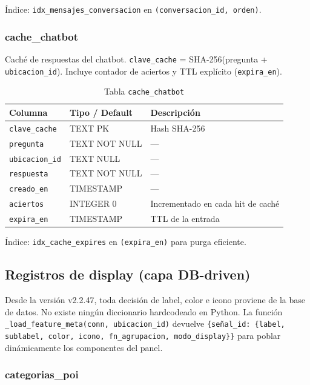 \documentclass[12pt, a4paper]{article}
\begin{document}
Índice: \texttt{idx\_mensajes\_conversacion} en \texttt{(conversacion\_id, orden)}.

\subsubsection{cache\_chatbot}

Caché de respuestas del chatbot. \texttt{clave\_cache} = SHA-256(pregunta + \texttt{ubicacion\_id}). Incluye contador de aciertos y TTL explícito (\texttt{expira\_en}).

\begin{table}[H]
\centering
\renewcommand{\arraystretch}{1.2}
\begin{tabular}{llp{5.5cm}}
\toprule
\textbf{Columna} & \textbf{Tipo / Default} & \textbf{Descripción} \\
\midrule
\texttt{clave\_cache}  & TEXT PK       & Hash SHA-256 \\
\texttt{pregunta}      & TEXT NOT NULL & — \\
\texttt{ubicacion\_id} & TEXT NULL     & — \\
\texttt{respuesta}     & TEXT NOT NULL & — \\
\texttt{creado\_en}    & TIMESTAMP     & — \\
\texttt{aciertos}      & INTEGER 0     & Incrementado en cada hit de caché \\
\texttt{expira\_en}    & TIMESTAMP     & TTL de la entrada \\
\bottomrule
\end{tabular}
\caption{Tabla \texttt{cache\_chatbot}}
\end{table}

Índice: \texttt{idx\_cache\_expires} en \texttt{(expira\_en)} para purga eficiente.

\subsection{Registros de display (capa DB-driven)}

Desde la versión v2.2.47, toda decisión de label, color e icono proviene de la base de datos.
No existe ningún diccionario hardcodeado en Python. La función \texttt{\_load\_feature\_meta(conn, ubicacion\_id)}
devuelve \texttt{\{señal\_id: \{label, sublabel, color, icono, fn\_agrupacion, modo\_display\}\}}
para poblar dinámicamente los componentes del panel.

\subsubsection{categorias\_poi}
\end{document}
